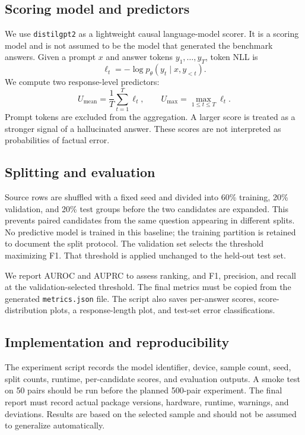 \documentclass[10pt]{article}
\begin{document}
\subsection{Scoring model and predictors}
We use \texttt{distilgpt2} as a lightweight causal language-model scorer. It is a scoring model and is not assumed to be the model that generated the benchmark answers. Given a prompt $x$ and answer tokens $y_1,\ldots,y_T$, token NLL is
\[
\ell_t=-\log p_\theta(y_t\mid x,y_{<t}).
\]
We compute two response-level predictors:
\[
U_{\mathrm{mean}}=\frac{1}{T}\sum_{t=1}^{T}\ell_t,\qquad U_{\mathrm{max}}=\max_{1\leq t\leq T}\ell_t.
\]
Prompt tokens are excluded from the aggregation. A larger score is treated as a stronger signal of a hallucinated answer. These scores are not interpreted as probabilities of factual error.

\subsection{Splitting and evaluation}
Source rows are shuffled with a fixed seed and divided into 60\% training, 20\% validation, and 20\% test groups before the two candidates are expanded. This prevents paired candidates from the same question appearing in different splits. No predictive model is trained in this baseline; the training partition is retained to document the split protocol. The validation set selects the threshold maximizing F1. That threshold is applied unchanged to the held-out test set.

We report AUROC and AUPRC to assess ranking, and F1, precision, and recall at the validation-selected threshold. The final metrics must be copied from the generated \texttt{metrics.json} file. The script also saves per-answer scores, score-distribution plots, a response-length plot, and test-set error classifications.

\subsection{Implementation and reproducibility}
The experiment script records the model identifier, device, sample count, seed, split counts, runtime, per-candidate scores, and evaluation outputs. A smoke test on 50 pairs should be run before the planned 500-pair experiment. The final report must record actual package versions, hardware, runtime, warnings, and deviations. Results are based on the selected sample and should not be assumed to generalize automatically.
\end{document}
